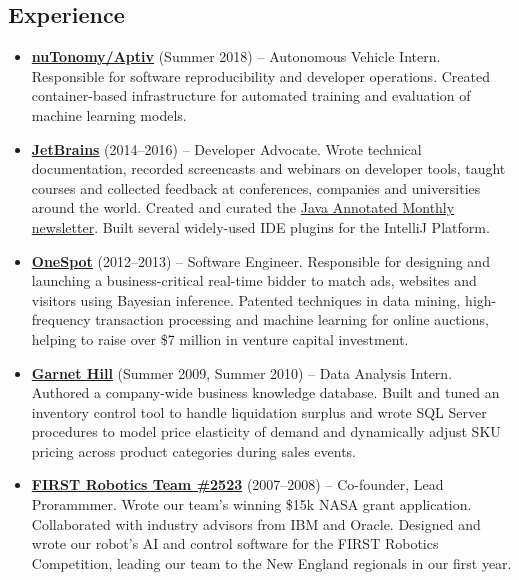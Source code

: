\documentclass[letterpaper,11pt]{article}
\newcommand{\resumeItem}[2]{
\item\small{
\textbf{#1}{ #2 \vspace{-2pt}}
}
}
\newcommand{\resumeSubItem}[2]{\resumeItem{#1}{#2}}
\newcommand{\resumeSubHeadingListStart}{\begin{itemize}[leftmargin=*]}
\newcommand{\resumeSubHeadingListEnd}{\end{itemize}}
\begin{document}
\begin{justify}
\section{Experience}
\resumeSubHeadingListStart
\resumeSubItem{\href{https://www.aptiv.com/}{nuTonomy/Aptiv}}{(Summer 2018) -- Autonomous Vehicle Intern. Responsible for software reproducibility and developer operations. Created container-based infrastructure for automated training and evaluation of machine learning models.}
\resumeSubItem{\href{https://www.jetbrains.com/}{JetBrains}}{(2014--2016) -- Developer Advocate. Wrote technical documentation, recorded screencasts and webinars on developer tools, taught courses and collected feedback at conferences, companies and universities around the world. Created and curated the \href{https://blog.jetbrains.com/idea/tag/java-annotated/}{Java Annotated Monthly newsletter}. Built several widely-used IDE plugins for the IntelliJ Platform.}
\resumeSubItem{\href{https://www.onespot.com/}{OneSpot}}{(2012--2013) -- Software Engineer. Responsible for designing and launching a business-critical real-time bidder to match ads, websites and visitors using Bayesian inference. Patented techniques in data mining, high-frequency transaction processing and machine learning for online auctions, helping to raise over \$7 million in venture capital investment.}
\resumeSubItem{\href{https://www.garnethill.com/}{Garnet Hill}}{(Summer 2009, Summer 2010) -- Data Analysis Intern. Authored a company-wide business knowledge database. Built and tuned an inventory control tool to handle liquidation surplus and wrote SQL Server procedures to model price elasticity of demand and dynamically adjust SKU pricing across product categories during sales events.}
\resumeSubItem{\href{https://www.firstinspires.org/}{FIRST Robotics Team \#2523}}{(2007--2008) -- Co-founder, Lead Prorammmer. Wrote our team's winning \$15k NASA grant application. Collaborated with industry advisors from IBM and Oracle. Designed and wrote our robot's AI and control software for the FIRST Robotics Competition, leading our team to the New England regionals in our first year.}
\resumeSubHeadingListEnd


\end{justify}
\end{document}
